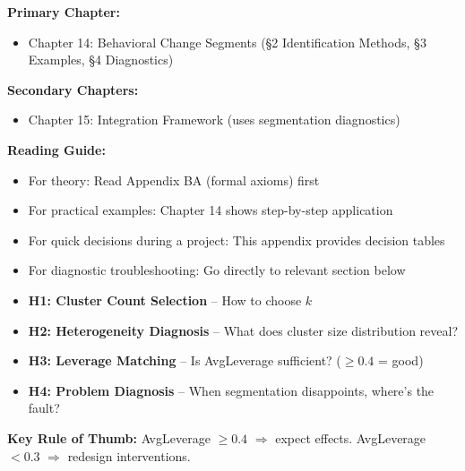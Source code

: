
\begin{tcolorbox}[colback=purple!5!white, colframe=purple!75!black,
    title=Chapter Linkage]

\textbf{Primary Chapter:}
\begin{itemize}[nosep]
\item Chapter 14: Behavioral Change Segments (§2 Identification Methods, §3 Examples, §4 Diagnostics)
\end{itemize}

\textbf{Secondary Chapters:}
\begin{itemize}[nosep]
\item Chapter 15: Integration Framework (uses segmentation diagnostics)
\end{itemize}

\textbf{Reading Guide:}
\begin{itemize}[nosep]
\item For theory: Read Appendix BA (formal axioms) first
\item For practical examples: Chapter 14 shows step-by-step application
\item For quick decisions during a project: This appendix provides decision tables
\item For diagnostic troubleshooting: Go directly to relevant section below
\end{itemize}

\end{tcolorbox}


\begin{tcolorbox}[colback=yellow!10!white, colframe=yellow!75!black,
    title=Quick Reference: The 4 Heuristics]

\begin{itemize}[nosep]
\item \textbf{H1: Cluster Count Selection} -- How to choose $k$
\item \textbf{H2: Heterogeneity Diagnosis} -- What does cluster size distribution reveal?
\item \textbf{H3: Leverage Matching} -- Is AvgLeverage sufficient? ($\geq 0.4$ = good)
\item \textbf{H4: Problem Diagnosis} -- When segmentation disappoints, where's the fault?
\end{itemize}

\textbf{Key Rule of Thumb:} AvgLeverage $\geq 0.4$ $\Rightarrow$ expect effects. AvgLeverage $< 0.3$ $\Rightarrow$ redesign interventions.

\end{tcolorbox}

